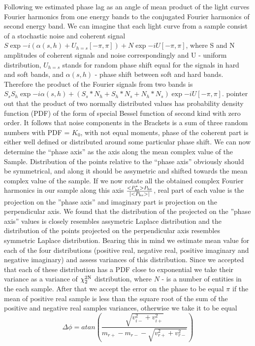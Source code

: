 \documentclass[a4paper,fleqn,usenatbib]{mnras}
\begin{document}
Following \citep{1997ApJ...474L..43V} we estimated phase lag as an angle of mean product of the light curves Fourier harmonics from one energy bands to the conjugated Fourier harmonics of second energy band. 
We can imagine that each light curve from a sample consist of a stochastic noise and coherent signal $S\exp{-i(\alpha(s, h) + U_{h=s}[-\pi, \pi])} + N\exp{-iU[-\pi, \pi]}$, where S and N amplitudes of coherent signals and noise correspondingly and U - uniform distribution, $U_{h=s}$ stands for random phase shift equal for the signals in hard and soft bands, and $\alpha(s, h)$ - phase shift between soft and hard bands.
Therefore the product of the Fourier signals from two bands is $S_{s}S_{h}\exp{-i\alpha(s, h) + (S_{s}*N_{h} + S_{h}*N_{s} + N_{h}*N_{s})\exp{-iU[-\pi, \pi]}}$.
\citep{bachetti17} pointer out that the product of two normally distributed values has probability density function (PDF) of the form of special Bessel function of second kind with zero order. 
It follows that noise components in the Brackets is a sum of three random numbers with PDF = $K_{0}$, with not equal moments, phase of the coherent part is either well defined or distributed around some particular phase shift.
We can now determine the ``phase axis'' as the axis along the mean complex value of the Sample.
Distribution of the points relative to the ``phase axis'' obviously should be symmetrical, and along it should be assymetric and shifted towards the mean complex value of the sample.
If we now rotate all the obtained complex Fourier harmonics in our sample along this axis $\frac{<P_{\rm hs}^{*}>P_{\rm hs}}{|<P_{\rm hs}>|}$, real part of each value is the projection on the ''phase axis'' and imaginary part is projection on the perpendicular axis. 
We found that the distribution of the projected on the ''phase axis'' values is closely resembles assymetric Laplace distribution and the distribution of the points projected on the perpendicular axis resembles symmetric Laplace distribution. 
Bearing this in mind we estimate mean value for each of the four distributions (positive real, negative real, positive imaginary and negative imaginary) and assess variances of this distribution.
Since we accepted that each of these distribution has a PDF close to exponential we take their variance as a variance of $\chi_2^{\rm 2N}$ distribution, where $N$ - is a number of entities in the each sample. 
After that we accept the error on the phase to be equal $\pi$ if the mean of positive real sample is less than the square root of the sum of the positive and negative real samples variances, otherwise we take it to be equal
\begin{equation}
        \Delta \phi = atan{\left(\frac{\sqrt{v_{i-}^2 + v_{i+}^{2}}}{m_{r+} - m_{r-} - \sqrt{v_{r+}^2 + v_{r-}^2}}\right)}
\end{equation}
\end{document}
